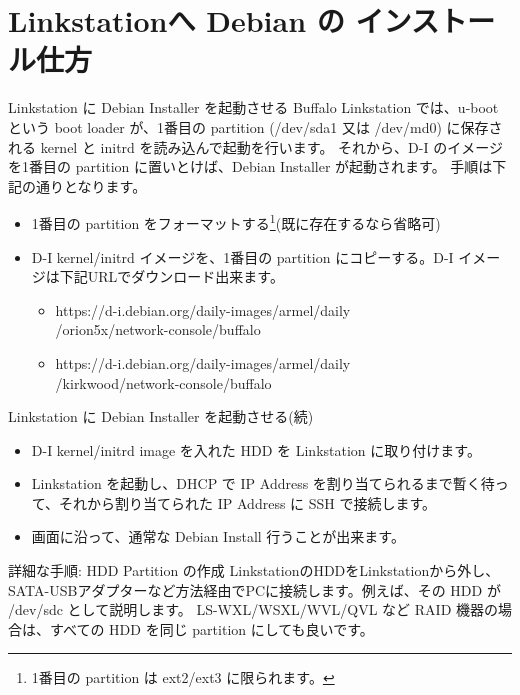 \section{Linkstationへ Debian の インストール仕方}

\begin{frame}{Linkstation に Debian Installer を起動させる}
Buffalo Linkstation では、u-boot という boot loader が、1番目の partition (/dev/sda1 又は /dev/md0) に保存される kernel と initrd を読み込んで起動を行います。
それから、D-I のイメージを1番目の partition に置いとけば、Debian Installer が起動されます。
手順は下記の通りとなります。
\begin{itemize}
\item 1番目の partition をフォーマットする\footnote{1番目の partition は ext2/ext3 に限られます。}(既に存在するなら省略可)
\item D-I kernel/initrd イメージを、1番目の partition にコピーする。D-I イメージは下記URLでダウンロード出来ます。
	\begin{itemize}
	\item https://d-i.debian.org/daily-images/armel/daily\\/orion5x/network-console/buffalo
	\item https://d-i.debian.org/daily-images/armel/daily\\/kirkwood/network-console/buffalo
	\end{itemize}
\end{itemize}
\end{frame}

\begin{frame}{Linkstation に Debian Installer を起動させる(続)}
\begin{itemize}
\item D-I kernel/initrd image を入れた HDD を Linkstation に取り付けます。
\item Linkstation を起動し、DHCP で IP Address を割り当てられるまで暫く待って、それから割り当てられた IP Address に SSH で接続します。
\item 画面に沿って、通常な Debian Install 行うことが出来ます。
\end{itemize}
\end{frame}

\begin{frame}[containsverbatim]{詳細な手順: HDD Partition の作成}
LinkstationのHDDをLinkstationから外し、SATA-USBアダプターなど方法経由でPCに接続します。例えば、その HDD が /dev/sdc として説明します。
LS-WXL/WSXL/WVL/QVL など RAID 機器の場合は、すべての HDD を同じ partition にしても良いです。
\end{frame}

